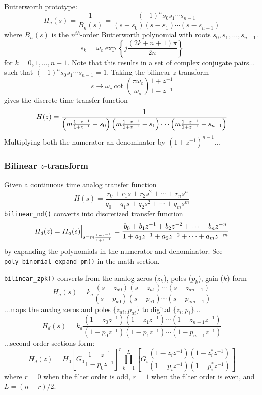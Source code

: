 Butterworth prototype:
\[
    H_a(s) = \frac{1}{B_n(s)}
           = \frac{
                (-1)^n s_0 s_1 \cdots s_{n-1}
            }{
                (s-s_0)(s-s_1) \cdots (s-s_{n-1})
            }
\]
where $B_n(s)$ is the $n^{th}$-order Butterworth polynomial with roots
$s_0,s_1,\ldots,s_{n-1}$.
\[
    s_k = \omega_c \exp\left\{
                j \frac{\left(2k+n+1\right)\pi}{2n}
          \right\}
\]
for $k=0,1,\ldots,n-1$.
Note that this results in a set of complex conjugate pairs... such that
$(-1)^n s_0 s_1 \cdots s_{n-1} = 1$.
Taking the bilinear $z$-transform
\[
    s \rightarrow \omega_c
                  \cot\left(\frac{\pi \omega_c}{\omega_s}\right)
                  \frac{1+z^{-1}}{1-z^{-1}}
\]
gives the discrete-time transfer function
\[
    H(z) = \frac{
            1
           }{
            \left(m\frac{1-z^{-1}}{1+z^{-1}}-s_0\right)
            \left(m\frac{1-z^{-1}}{1+z^{-1}}-s_1\right)
            \cdots
            \left(m\frac{1-z^{-1}}{1+z^{-1}}-s_{n-1}\right)
           }
\]
Multiplying both the numerator an denominator by $(1+z^{-1})^{n-1}$...

\subsubsection{Bilinear $z$-transform}
Given a continuous time analog transfer function
\[
    H(s) =  \frac{
                r_0 + r_1 s + r_2 s^2 + \cdots + r_n s^n
            }{
                q_0 + q_1 s + q_2 s^2 + \cdots + q_m s^m
            }
\]
{\tt bilinear\_nd()} converts into discretized transfer function
\[
    H_d(z) = H_a(s)\Bigl.\Bigr|_{s = m\frac{1-z^{-1}}{1+z^{-1}}}
           =    \frac{
                    b_0 + b_1 z^{-1} + b_2 z^{-2} + \cdots + b_n z^{-n}
                }{
                    1   + a_1 z^{-1} + a_2 z^{-2} + \cdots + a_m z^{-m}
                }
\]
by expanding the polynomials in the numerator and denominator.
See {\tt poly\_binomial\_expand\_pm()} in the math section.

{\tt bilinear\_zpk()} converts from the analog zeros ($z_k$), poles ($p_k$),
gain ($k$) form
\[
    H_a(s) = k_a
            \frac{
                (s-z_{a0})(s-z_{a1})\cdots(s-z_{an-1})
            }{
                (s-p_{a0})(s-p_{a1})\cdots(s-p_{am-1})
            }
\]
...maps the analog zeros and poles $\{z_{ai},p_{ai}\}$
to digital $\{z_{i},p_{i}\}$...
\[
    H_d(s) = k_d
            \frac{
                (1-z_{0}z^{-1})(1-z_{1}z^{-1})\cdots(1-z_{n-1}z^{-1})
            }{
                (1-p_{0}z^{-1})(1-p_{1}z^{-1})\cdots(1-p_{n-1}z^{-1})
            }
\]
...second-order sections form:
\[
    H_d(z) = H_0
             \left[
                G_0 \frac{1 + z^{-1}}
                         {1 - p_0 z^{-1}}
             \right]^r
             \prod_{k=1}^{L} {\left[
                G_i \frac{(1-z_iz^{-1})(1-z_i^*z^{-1})}
                         {(1-p_iz^{-1})(1-p_i^*z^{-1})}
             \right]}
\]
where $r=0$ when the filter order is odd, $r=1$ when the filter order is even,
and $L=(n-r)/2$.

